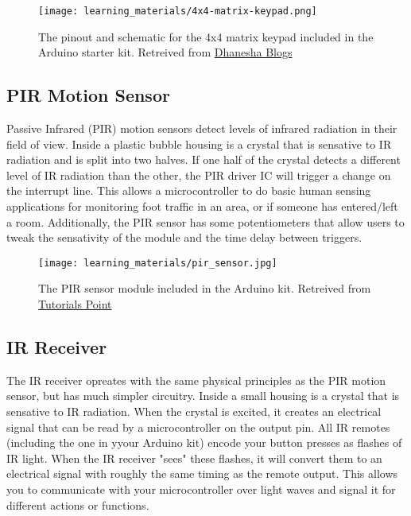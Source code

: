     \begin{figure}[h]
        \texttt{[image: learning\_materials/4x4-matrix-keypad.png]}
        \caption[4x4 Matrix Keypad]{The pinout and schematic for the 4x4 matrix keypad included in the Arduino starter kit. 
        Retreived from \href{https://dhaneshablogs.blogspot.com/2019/08/interfacing-4x4-matrix-keypad-with.html}
        {Dhanesha Blogs}}
    \end{figure}

    \subsection*{PIR Motion Sensor}
    Passive Infrared (PIR) motion sensors detect levels of infrared radiation in their field of view.
    Inside a plastic bubble housing is a crystal that is sensative to IR radiation and is split into two halves.
    If one half of the crystal detects a different level of IR radiation than the other, the PIR driver IC will trigger a change on the interrupt line.
    This allows a microcontroller to do basic human sensing applications for monitoring foot traffic in an area, or if someone has entered/left a room.
    Additionally, the PIR sensor has some potentiometers that allow users to tweak the sensativity of the module and the time delay between triggers.

    \begin{figure}[h]
        \texttt{[image: learning\_materials/pir\_sensor.jpg]}
        \caption[PIR Sensor]{The PIR sensor module included in the Arduino kit. 
        Retreived from \href{https://www.tutorialspoint.com/arduino/arduino_pir_sensor.htm}
        {Tutorials Point}}
    \end{figure}

    \subsection*{IR Receiver}
    The IR receiver opreates with the same physical principles as the PIR motion sensor, but has much simpler circuitry.
    Inside a small housing is a crystal that is sensative to IR radiation.
    When the crystal is excited, it creates an electrical signal that can be read by a microcontroller on the output pin.
    All IR remotes (including the one in yyour Arduino kit) encode your button presses as flashes of IR light.
    When the IR receiver "sees" these flashes, it will convert them to an electrical signal with roughly the same timing as the remote output.
    This allows you to communicate with your microcontroller over light waves and signal it for different actions or functions. 

